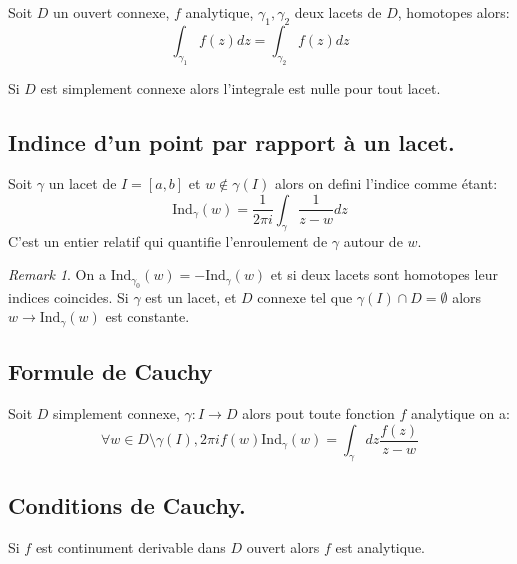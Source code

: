 \documentclass[10pt,a4paper]{article}
\theoremstyle{definition}
\theoremstyle{theorem}
\theoremstyle{remark}
\newtheorem*{remark}{Remark}
\begin{document}
\theorem Soit $D$ un ouvert connexe, $f$ analytique, $\gamma_1, \gamma_2$ deux lacets de $D$, homotopes alors:
$$
\int_{\gamma_1} f(z) dz = \int_{\gamma_2} f(z) dz
$$

\corollary Si $D$ est simplement connexe alors l'integrale est nulle pour tout lacet.

\subsection{Indince d'un point par rapport à un lacet.}
 Soit $\gamma$ un lacet de $I = [a,b]$ et $w \not\in \gamma(I)$ alors on defini l'indice comme étant:
$$
\text{Ind}_\gamma (w) = \frac{1}{2 \pi i} \int_\gamma \frac{1}{z - w} dz
$$
C'est un entier relatif qui quantifie l'enroulement de $\gamma$ autour de $w$.
\begin{remark}
On a $\text{Ind}_{\gamma_0}(w) = -\text{Ind}_\gamma(w)$ et si deux lacets sont homotopes leur indices coincides.
\prop Si $\gamma$ est un lacet, et $D$ connexe tel que $\gamma(I) \cap D = \emptyset$ alors $w \rightarrow \text{Ind}_\gamma(w)$ est constante.
\end{remark}

\subsection{Formule de Cauchy}
\theorem Soit $D$ simplement connexe, $\gamma : I \to D$ alors pout toute fonction $f$ analytique on a:
$$
\forall w \in D \setminus \gamma(I), 2\pi i f(w) \text{Ind}_\gamma(w) = \int_\gamma dz \frac{f(z)}{z - w}
$$

\subsection{Conditions de Cauchy.}
\theorem Si $f$ est continument derivable dans $D$ ouvert alors $f$ est analytique.
\end{document}
